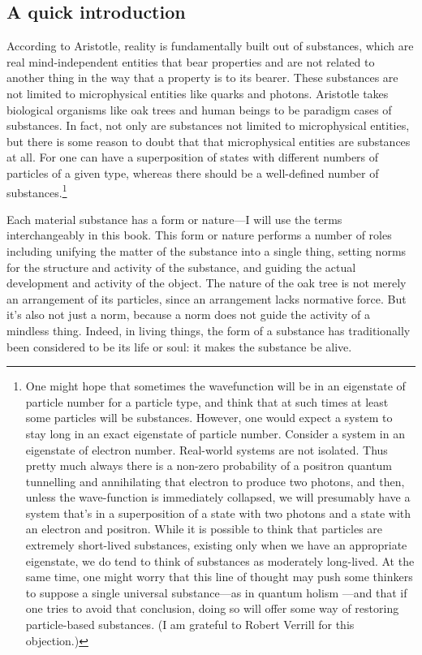 \subsection{A quick introduction}
According to Aristotle, reality is fundamentally built out of substances, which are real mind-independent entities that
bear properties and are not related to another thing in the way that a property is to its bearer.
These substances are not limited to microphysical entities like quarks and photons. Aristotle takes biological organisms 
like oak trees and human beings to be paradigm cases of substances. In fact, not only are substances not limited to 
microphysical entities, but there is some reason to doubt that that microphysical entities are substances at all. For 
one can have a superposition of states with different numbers of particles of a given type, whereas there should be a well-defined 
number of substances.\footnote{One might hope that sometimes the wavefunction will be in an eigenstate of particle
number for a particle type, and think that at such times at least some particles will be substances. However, one would expect a system
to stay long in an exact eigenstate of particle number. Consider a system in an eigenstate of electron number. Real-world
systems are not isolated. Thus pretty much always there is a non-zero probability of a positron quantum tunnelling and annihilating
that electron to produce two photons, and then, unless the wave-function is immediately collapsed, we will presumably have 
a system that's in a superposition of a state with two photons and a state with an electron and positron. While it is possible
to think that particles are extremely short-lived substances, existing only when we have an appropriate eigenstate, we do tend
to think of substances as moderately long-lived. At the same time, one might worry that this line of thought may push some 
thinkers to suppose a single universal substance---as in quantum holism \parencite{IsmaelSchafferQHolism}---and that if one tries to avoid
that conclusion, doing so will offer some way of restoring particle-based substances. (I am grateful to Robert Verrill 
for
this objection.)}

Each material substance has a form or nature---I will use the terms interchangeably in this book. This form or nature performs a number of roles including unifying the matter of the 
substance into a single thing, setting norms for the structure and activity of the substance, and guiding the actual 
development and activity of the object. The nature of the oak tree is not merely an arrangement of its particles, since an
arrangement lacks normative force. But it's also not just a norm, because a norm does not guide the activity of a mindless
thing. Indeed, in living things, the form of a substance has traditionally been considered to be its life or soul: it makes the substance
be alive. 

